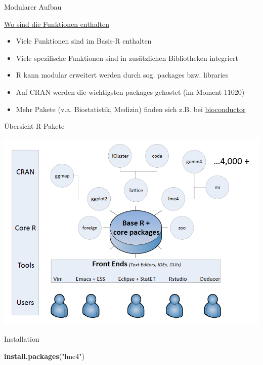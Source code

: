 \documentclass[ignorenonframetext,]{beamer}
\newenvironment{Shaded}{}{}
\newcommand{\KeywordTok}[1]{\textcolor[rgb]{0.00,0.44,0.13}{\textbf{{#1}}}}
\newcommand{\StringTok}[1]{\textcolor[rgb]{0.25,0.44,0.63}{{#1}}}
\newcommand{\NormalTok}[1]{{#1}}
\providecommand{\tightlist}{%
\setlength{\itemsep}{0pt}\setlength{\parskip}{0pt}}
\begin{document}
\begin{frame}[fragile]{Modularer Aufbau}

\begin{block}{\href{https://stats.idre.ucla.edu/r/seminars/intro/}{Wo
sind die Funktionen enthalten}}

\begin{itemize}
\tightlist
\item
  Viele Funktionen sind im Basis-R enthalten
\item
  Viele spezifische Funktionen sind in zusätzlichen Bibliotheken
  integriert
\item
  R kann modular erweitert werden durch sog. packages bzw. libraries
\item
  Auf CRAN werden die wichtigsten packages gehostet (im Moment 11020)
\item
  Mehr Pakete (v.a. Biostatistik, Medizin) finden sich z.B. bei
  \href{www.bioconductor.org}{bioconductor}
\end{itemize}

\end{block}

\begin{block}{Übersicht R-Pakete}

\includegraphics{./tex2pdf.9796/6246b503fa80f41683217b14cc9372e5ef61a781.png}

\end{block}

\begin{block}{Installation}

\begin{Shaded}
\begin{Highlighting}[]
\KeywordTok{install.packages}\NormalTok{(}\StringTok{"lme4"}\NormalTok{)}


\end{Highlighting}
\end{Shaded}
\end{block}
\end{frame}
\end{document}
